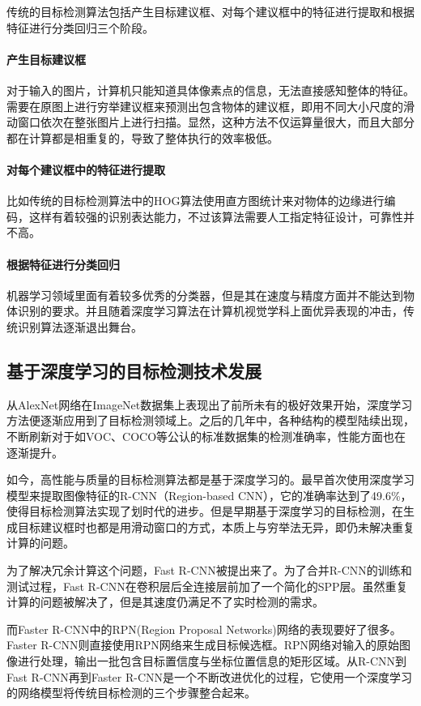 传统的目标检测算法包括产生目标建议框、对每个建议框中的特征进行提取和根据特征进行分类回归三个阶段。

\paragraph{产生目标建议框}对于输入的图片，计算机只能知道具体像素点的信息，无法直接感知整体的特征。需要在原图上进行穷举建议框来预测出包含物体的建议框，即用不同大小尺度的滑动窗口依次在整张图片上进行扫描。显然，这种方法不仅运算量很大，而且大部分都在计算都是相重复的，导致了整体执行的效率极低。

\paragraph{对每个建议框中的特征进行提取}比如传统的目标检测算法中的HOG算法\cite{HOG}使用直方图统计来对物体的边缘进行编码，这样有着较强的识别表达能力，不过该算法需要人工指定特征设计，可靠性并不高。

\paragraph{根据特征进行分类回归}机器学习领域里面有着较多优秀的分类器，但是其在速度与精度方面并不能达到物体识别的要求。并且随着深度学习算法在计算机视觉学科上面优异表现的冲击，传统识别算法逐渐退出舞台。

\subsection{基于深度学习的目标检测技术发展}

从AlexNet网络在ImageNet数据集上表现出了前所未有的极好效果开始，深度学习方法便逐渐应用到了目标检测领域上。之后的几年中，各种结构的模型陆续出现，不断刷新对于如VOC、COCO等公认的标准数据集的检测准确率，性能方面也在逐渐提升。

如今，高性能与质量的目标检测算法都是基于深度学习的。最早首次使用深度学习模型来提取图像特征的R-CNN（Region-based CNN）\cite{RCNN}，它的准确率达到了49.6\%，使得目标检测算法实现了划时代的进步。但是早期基于深度学习的目标检测，在生成目标建议框时也都是用滑动窗口的方式，本质上与穷举法无异，即仍未解决重复计算的问题。

为了解决冗余计算这个问题，Fast R-CNN\cite{FRCNN}被提出来了。为了合并R-CNN的训练和测试过程，Fast R-CNN在卷积层后全连接层前加了一个简化的SPP层。虽然重复计算的问题被解决了，但是其速度仍满足不了实时检测的需求。

而Faster R-CNN\cite{Faster}中的RPN(Region Proposal Networks)网络的表现要好了很多。Faster R-CNN\cite{Faster}则直接使用RPN网络来生成目标候选框。RPN网络对输入的原始图像进行处理，输出一批包含目标置信度与坐标位置信息的矩形区域。从R-CNN到Fast R-CNN再到Faster R-CNN是一个不断改进优化的过程，它使用一个深度学习的网络模型将传统目标检测的三个步骤整合起来。

